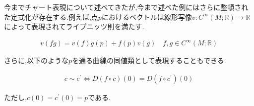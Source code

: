 \documentclass{jsarticle}
\begin{document}
今までチャート表現について述べてきたが,今まで述べた例にはさらに整頓された定式化が存在する.例えば,点$p$におけるベクトルは線形写像$v:C^\infty(M;\mathbb{R})\to\mathbb{R}$によって表現されてライプニッツ則を満たす.

\begin{align}
v(fg)=v(f)g(p)+f(p)v(g)\quad f,g\in C^\infty(M;\mathbb{R})
\end{align}

さらに,以下のような$p$を通る曲線の同値類として表現することもできる.

\begin{align}
c\sim c^\prime \Leftrightarrow D(f\circ c)(0)=D(f \circ c^\prime)(0)
\end{align}

ただし,$c(0)=c^\prime(0)=p$である.
\end{document}
